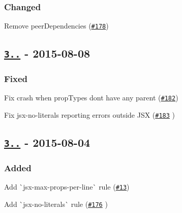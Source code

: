 \subsubsection*{Changed}


\begin{DoxyItemize}
\item Remove peer\+Dependencies (\href{https://github.com/yannickcr/eslint-plugin-react/issues/178}{\tt \#178})
\end{DoxyItemize}

\subsection*{\href{https://github.com/yannickcr/eslint-plugin-react/compare/v3.2.0...v3.2.1}{\tt 3..} -\/ 2015-\/08-\/08}

\subsubsection*{Fixed}


\begin{DoxyItemize}
\item Fix crash when prop\+Types don\textquotesingle{}t have any parent (\href{https://github.com/yannickcr/eslint-plugin-react/issues/182}{\tt \#182})
\item Fix jsx-\/no-\/literals reporting errors outside J\+SX (\href{https://github.com/yannickcr/eslint-plugin-react/pull/183}{\tt \#183} )
\end{DoxyItemize}

\subsection*{\href{https://github.com/yannickcr/eslint-plugin-react/compare/v3.1.0...v3.2.0}{\tt 3..} -\/ 2015-\/08-\/04}

\subsubsection*{Added}


\begin{DoxyItemize}
\item Add \`{}jsx-\/max-\/props-\/per-\/line\`{} rule (\href{https://github.com/yannickcr/eslint-plugin-react/issues/13}{\tt \#13})
\item Add \`{}jsx-\/no-\/literals\`{} rule (\href{https://github.com/yannickcr/eslint-plugin-react/pull/176}{\tt \#176} )
\end{DoxyItemize}

